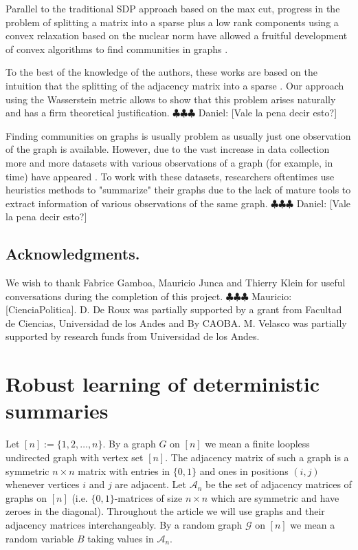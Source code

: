 \documentclass[12pt]{amsart}
\theoremstyle{remark}
\newcommand{\grG}{{\mathcal{G}}}
\newcommand{\ddr}[1]{{\color{blue} \sf $\clubsuit\clubsuit\clubsuit$ Daniel: [#1]}}
\newcommand{\mv}[1]{{\color{red} \sf $\clubsuit\clubsuit\clubsuit$ Mauricio: [#1]}}
\begin{document}
Parallel to the traditional SDP approach based on the max cut, progress in the problem of splitting a matrix into a sparse  plus a low rank components using a convex relaxation based on the nuclear norm \cite{candes2011robust,chandrasekaran2011rank,candes2009exact} have allowed a fruitful development of  convex algorithms to find communities in graphs \cite{ames2011nuclear,vinayak2014sharp,chen2012clustering,chen2014clustering,oymak2011finding,ailon2013breaking}.

To the best of the knowledge of the authors, these works are based on the intuition that the splitting of the adjacency  matrix into a sparse . Our approach using the Wasserstein metric allows to show that this problem arises naturally and has a firm theoretical justification. \ddr{Vale la pena decir esto?}

Finding communities on graphs is usually  problem as usually just one observation of the graph is available. However, due to the vast increase in data collection more and more datasets with various observations of a graph (for example, in time) have appeared \cite{snapnets}. To work with these datasets, researchers oftentimes use heuristics methods to "summarize" their graphs due to the lack of mature tools to extract information of various observations of the same graph.  \ddr{Vale la pena decir esto?}



\subsection{Acknowledgments.}
We wish to thank Fabrice Gamboa, Mauricio Junca and Thierry Klein for useful conversations during the completion of this project. \mv{CienciaPolitica}.
D. De Roux was partially supported by a grant from Facultad de Ciencias, Universidad de los Andes and By CAOBA. M. Velasco was partially supported by research funds from Universidad de los Andes. 


\section{Robust learning of deterministic summaries}
Let $[n]:=\{1,2,\dots, n\}$. By a graph $G$ on $[n]$ we mean a finite loopless undirected graph with vertex set $[n]$. The adjacency matrix of such a graph is a symmetric $n\times n$ matrix with entries in $\{0,1\}$ and ones in positions $(i,j)$ whenever vertices $i$ and $j$ are adjacent. Let $\mathcal{A}_n$ be the set of adjacency matrices of graphs on $[n]$ (i.e. $\{0,1\}$-matrices of size $n\times n$ which are symmetric and have zeroes in the diagonal). Throughout the article we will use graphs and their adjacency matrices interchangeably. By a random graph $\grG$ on $[n]$ we mean a random variable $B$ taking values in $\mathcal{A}_n$.
\end{document}
